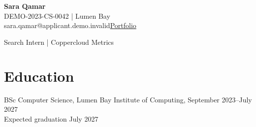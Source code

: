 
{\LARGE\textbf{Sara Qamar}}\\
DEMO-2023-CS-0042 | Lumen Bay\\
sara.qamar@applicant.demo.invalid\quad \href{https://portfolio.demo.invalid/sara-qamar}{Portfolio}
\par\small{Search Intern | Coppercloud Metrics}\par
\section{Education}
BSc Computer Science, Lumen Bay Institute of Computing, September 2023–July 2027\\
Expected graduation July 2027
